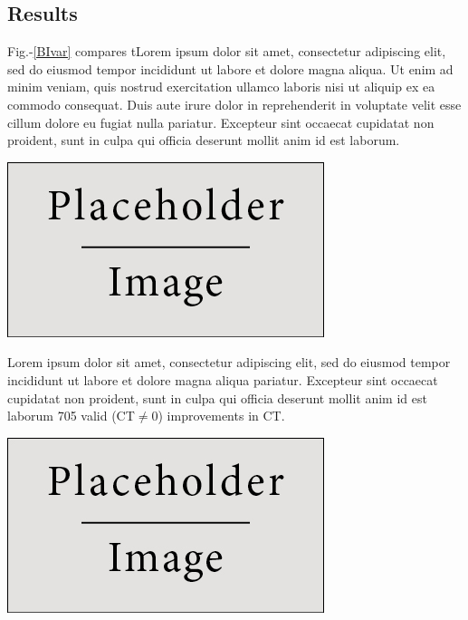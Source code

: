 \documentclass[a0,portrait]{a0poster}
\begin{document}
\begin{minipage}[c]{\linewidth}
\begin{framed}
\begin{multicols}{2}
\section*{Results}
Fig.-\ref{BIvar} compares tLorem ipsum dolor sit amet, consectetur adipiscing elit, sed do eiusmod tempor incididunt ut labore et dolore magna aliqua. Ut enim ad minim veniam, quis nostrud exercitation ullamco laboris nisi ut aliquip ex ea commodo consequat. Duis aute irure dolor in reprehenderit in voluptate velit esse cillum dolore eu fugiat nulla pariatur. Excepteur sint occaecat cupidatat non proident, sunt in culpa qui officia deserunt mollit anim id est laborum.
\begin{center}
\includegraphics[width=0.8\linewidth]{figures/placeholder}
\label{BIvar}
\end{center}
Lorem ipsum dolor sit amet, consectetur adipiscing elit, sed do eiusmod tempor incididunt ut labore et dolore magna aliqua pariatur. Excepteur sint occaecat cupidatat non proident, sunt in culpa qui officia deserunt mollit anim id est laborum 705 valid (CT$\neq$0) improvements in CT.
\begin{center}
\includegraphics[width=0.9\linewidth]{figures/placeholder}

\end{center}
\end{multicols}
\end{framed}
\end{minipage}
\end{document}
